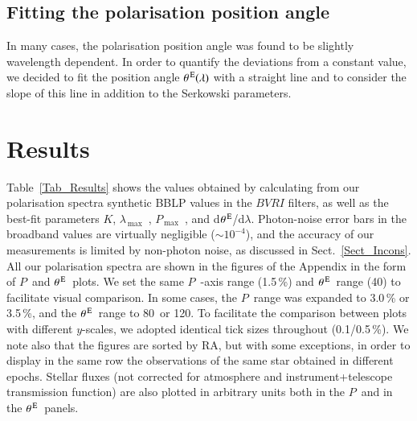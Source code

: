 \documentclass[a4paper]{aa}
\newcommand{\pl}{\ensuremath{P}}
\newcommand{\thetae}{\ensuremath{\theta^{\rm \,E}}}
\newcommand{\lmax}{\ensuremath{\lambda_\mathrm{\,max}}}
\newcommand{\lmaxi}{\ensuremath{\lambda'_\mathrm{\,max}}}
\newcommand{\lmaxii}{\ensuremath{\lambda''_\mathrm{\,max}}}
\newcommand{\pmax}{\ensuremath{P_\mathrm{\,max}}}
\newcommand{\pmaxi}{\ensuremath{P'_{\mathrm{\,max}}}}
\newcommand{\pmaxii}{\ensuremath{P''_{\mathrm{\,max}}}}
\begin{document}
\subsection{Fitting the polarisation position angle}
In many cases, the polarisation position angle was found to be slightly wavelength
dependent. In order to quantify the deviations from a constant value, we
decided to fit the position angle $\thetae(\lambda)$ with a straight line
and to consider the slope of this line in addition to the Serkowski parameters.

\section{Results}\label{Sect_Results}
Table~\ref{Tab_Results} shows the values obtained by calculating from
our polarisation spectra synthetic BBLP values in the $BVRI$ filters,
as well as the best-fit parameters $K$, \lmax\, , \pmax\ , and
d$\thetae$/d$\lambda$.  Photon-noise error bars in the broadband
values are virtually negligible ($\sim 10^{-4}$), and the accuracy of
our measurements is limited by non-photon noise, as discussed in
Sect.~\ref{Sect_Incons}.  All our polarisation spectra are shown in
the figures of the Appendix in the form of \pl\ and \thetae\ plots. We set the same
\pl\ -axis range (1.5\,\%) and \thetae\ range (40\degr) to facilitate
visual comparison. In some cases,
the \pl\ range was expanded to 3.0\,\% or 3.5\,\%, and the
\thetae\ range to 80\degr\ or 120\degr. To facilitate the comparison
between plots with different $y$-scales, we adopted identical
tick sizes throughout (0.1/0.5\,\%). We note also that the figures
are sorted
by RA, but with some exceptions, in order to display in the same row
the observations of the same star obtained in different
epochs. Stellar fluxes (not corrected for atmosphere and instrument+telescope
transmission function) are also plotted in arbitrary units both in
the \pl\ and in the \thetae\ panels.
\end{document}
